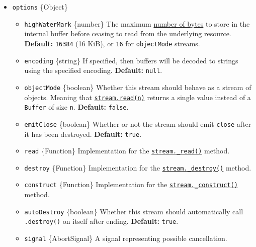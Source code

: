 \begin{itemize}
\tightlist
\item
  \texttt{options} \{Object\}

  \begin{itemize}
  \tightlist
  \item
    \texttt{highWaterMark} \{number\} The maximum
    \hyperref[highwatermark-discrepancy-after-calling-readablesetencoding]{number
    of bytes} to store in the internal buffer before ceasing to read
    from the underlying resource. \textbf{Default:} \texttt{16384} (16
    KiB), or \texttt{16} for \texttt{objectMode} streams.
  \item
    \texttt{encoding} \{string\} If specified, then buffers will be
    decoded to strings using the specified encoding. \textbf{Default:}
    \texttt{null}.
  \item
    \texttt{objectMode} \{boolean\} Whether this stream should behave as
    a stream of objects. Meaning that
    \hyperref[readablereadsize]{\texttt{stream.read(n)}} returns a
    single value instead of a \texttt{Buffer} of size \texttt{n}.
    \textbf{Default:} \texttt{false}.
  \item
    \texttt{emitClose} \{boolean\} Whether or not the stream should emit
    \texttt{\textquotesingle{}close\textquotesingle{}} after it has been
    destroyed. \textbf{Default:} \texttt{true}.
  \item
    \texttt{read} \{Function\} Implementation for the
    \hyperref[readable_readsize]{\texttt{stream.\_read()}} method.
  \item
    \texttt{destroy} \{Function\} Implementation for the
    \hyperref[readable_destroyerr-callback]{\texttt{stream.\_destroy()}}
    method.
  \item
    \texttt{construct} \{Function\} Implementation for the
    \hyperref[readable_constructcallback]{\texttt{stream.\_construct()}}
    method.
  \item
    \texttt{autoDestroy} \{boolean\} Whether this stream should
    automatically call \texttt{.destroy()} on itself after ending.
    \textbf{Default:} \texttt{true}.
  \item
    \texttt{signal} \{AbortSignal\} A signal representing possible
    cancellation.
  \end{itemize}
\end{itemize}

\begin{Shaded}
\begin{Highlighting}[]
\OperatorTok{=} \NormalTok{(}\NormalTok{)}\OperatorTok{;}

    \OperatorTok{;}
\NormalTok{  \}}
\NormalTok{\}}
\end{Highlighting}
\end{Shaded}

